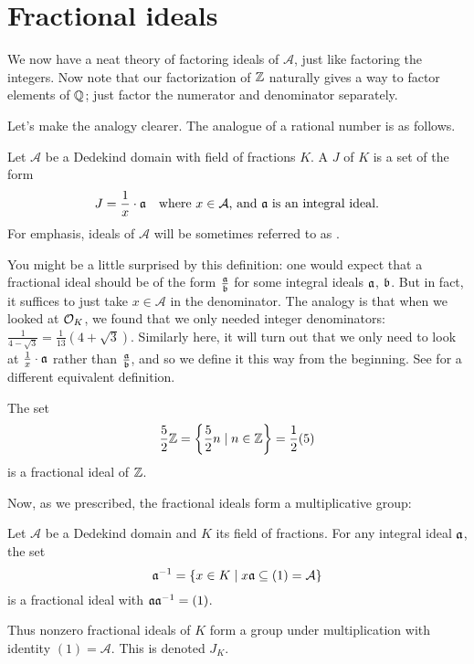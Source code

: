 \section{Fractional ideals}
We now have a neat theory of factoring ideals of $\mathcal A$,
just like factoring the integers.
Now note that our factorization of $\mathbb Z$ naturally gives a way to factor
elements of $\mathbb Q$; just factor the numerator and denominator separately.

Let's make the analogy clearer.
The analogue of a rational number is as follows.

\begin{definition}
	Let $\mathcal A$ be a Dedekind domain with field of fractions $K$.
	A  $J$ of $K$ is a set of the form 
	\[ J = \frac{1}{x} \cdot \mathfrak a \quad \text{where $x \in \mathcal A$, and $\mathfrak a$ is an integral ideal.} \]
	For emphasis, ideals of $\mathcal A$ will be sometimes referred to as .
\end{definition}

You might be a little surprised by this definition:
one would expect that a fractional ideal should be of the form $\frac{\mathfrak a}{\mathfrak b}$
for some integral ideals $\mathfrak a$, $\mathfrak b$.
But in fact, it suffices to just take $x \in \mathcal A$ in the denominator.
The analogy is that when we looked at $\mathcal O_K$, we found that we only needed
integer denominators: $\frac{1}{4-\sqrt3} = \frac{1}{13}(4+\sqrt3)$.
Similarly here, it will turn out that we only need to look at $\frac1x \cdot \mathfrak a$
rather than $\frac{\mathfrak a}{\mathfrak b}$, and so we define it this way from the beginning.
See  for a different equivalent definition.

\begin{example}
	The set \[ \frac52 \mathbb Z = \left\{ \frac52n \mid n \in \mathbb Z \right\} = \frac{1}{2} (5) \]
	is a fractional ideal of $\mathbb Z$.
\end{example}

Now, as we prescribed, the fractional ideals form a multiplicative group:
\begin{theorem}
	Let $\mathcal A$ be a Dedekind domain and $K$ its field of fractions.
	For any integral ideal $\mathfrak a$, the set
	\[ \mathfrak a^{-1} = \left\{ x \in K
			\mid x\mathfrak a \subseteq (1) = \mathcal A \right\} \]
	is a fractional ideal with $\mathfrak a \mathfrak a^{-1} = (1)$.
\end{theorem}
\begin{definition}
	Thus nonzero fractional ideals of $K$ form a group under multiplication
	with identity $(1) = \mathcal A$.
	This  is denoted $J_K$.
\end{definition}

